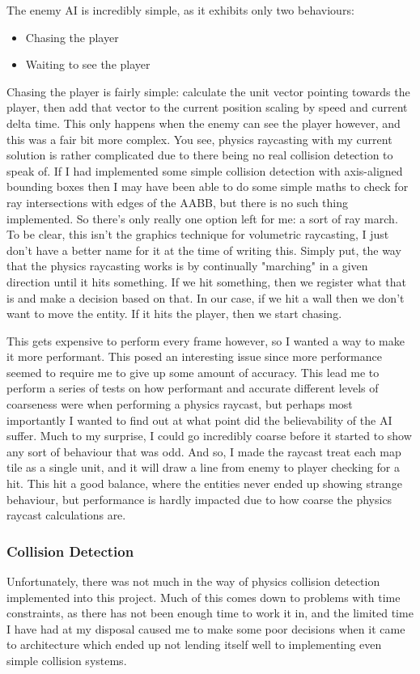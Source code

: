 \documentclass{article}
\begin{document}
The enemy AI is incredibly simple, as it exhibits only two behaviours:

\begin{itemize}
    \item Chasing the player
    \item Waiting to see the player
\end{itemize}

Chasing the player is fairly simple: calculate the unit vector pointing towards
the player, then add that vector to the current position scaling by speed and
current delta time. This only happens when the enemy can see the player however,
and this was a fair bit more complex. You see, physics raycasting with my
current solution is rather complicated due to there being no real collision
detection to speak of. If I had implemented some simple collision detection with
axis-aligned bounding boxes then I may have been able to do some simple maths to
check for ray intersections with edges of the AABB, but there is no such thing
implemented. So there's only really one option left for me: a sort of ray march.
To be clear, this isn't the graphics technique for volumetric raycasting, I just
don't have a better name for it at the time of writing this. Simply put, the way
that the physics raycasting works is by continually "marching" in a given
direction until it hits something. If we hit something, then we register what
that is and make a decision based on that. In our case, if we hit a wall then we
don't want to move the entity. If it hits the player, then we start chasing.

This gets expensive to perform every frame however, so I wanted a way to make it
more performant. This posed an interesting issue since more performance seemed
to require me to give up some amount of accuracy. This lead me to perform a
series of tests on how performant and accurate different levels of coarseness
were when performing a physics raycast, but perhaps most importantly I wanted to
find out at what point did the believability of the AI suffer. Much to my
surprise, I could go incredibly coarse before it started to show any sort of
behaviour that was odd. And so, I made the raycast treat each map tile as a
single unit, and it will draw a line from enemy to player checking for a hit.
This hit a good balance, where the entities never ended up showing strange
behaviour, but performance is hardly impacted due to how coarse the physics
raycast calculations are.

\subsubsection{Collision Detection}
Unfortunately, there was not much in the way of physics collision detection
implemented into this project. Much of this comes down to problems with time
constraints, as there has not been enough time to work it in, and the limited
time I have had at my disposal caused me to make some poor decisions when it
came to architecture which ended up not lending itself well to implementing
even simple collision systems.
\end{document}
